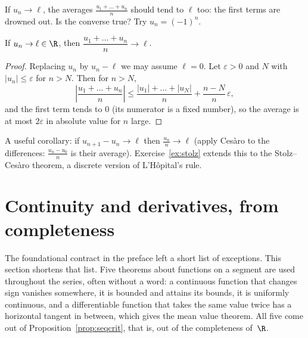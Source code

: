\begin{think}
If $u_n\to\ell$, the averages $\frac{u_1+\dots+u_n}n$ should tend to $\ell$ too: the first terms are drowned out. Is the converse true? Try $u_n=(-1)^n$.
\end{think}

\begin{theorem}\label{thm:cesaro}
If $u_n\to\ell\in\R$, then $\dfrac{u_1+\dots+u_n}n\to\ell$.
\end{theorem}
\begin{proof}
Replacing $u_n$ by $u_n-\ell$ we may assume $\ell=0$. Let $\varepsilon>0$ and $N$ with $|u_n|\le\varepsilon$ for $n>N$. Then for $n>N$,
\[
\left|\frac{u_1+\dots+u_n}n\right|\le\frac{|u_1|+\dots+|u_N|}n+\frac{n-N}n\,\varepsilon,
\]
and the first term tends to $0$ (its numerator is a fixed number), so the average is at most $2\varepsilon$ in absolute value for $n$ large.
\end{proof}

A useful corollary: if $u_{n+1}-u_n\to\ell$ then $\frac{u_n}n\to\ell$ (apply Ces\`aro to the differences: $\frac{u_n-u_0}n$ is their average).
Exercise~\ref{ex:stolz} extends this to the Stolz--Ces\`aro theorem, a discrete version of L'H\^opital's rule.

\section{Continuity and derivatives, from completeness}

The foundational contract in the preface left a short list of exceptions. This section shortens that list. Five theorems about functions on a segment are used throughout the series, often without a word: a continuous function that changes sign
vanishes somewhere, it is bounded and attains its bounds, it is uniformly continuous, and a differentiable function that takes the same value twice
has a horizontal tangent in between, which gives the mean value theorem. All five come out of Proposition~\ref{prop:seqcrit}, that is, out of the
completeness of~$\R$.

